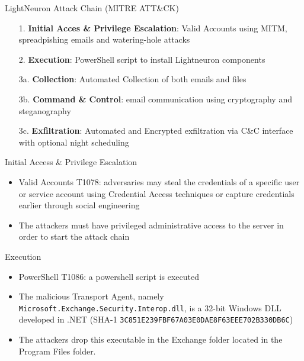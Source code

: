 \begin{frame}[fragile]{LightNeuron Attack Chain (MITRE ATT\&CK)}
    
    \begin{enumerate}
        \item[1.] \textbf{Initial Acces \& Privilege Escalation}: Valid Accounts using MITM, spreadpishing emails and watering-hole attacks
        \item[2.] \textbf{Execution}: PowerShell script to install Lightneuron components
        \item[3a.] \textbf{Collection}: Automated Collection of both emails and files
        \item[3b.] \textbf{Command \& Control}: email communication using cryptography and steganography
        \item[3c.] \textbf{Exfiltration}: Automated and Encrypted exfiltration via C\&C interface with optional night scheduling
    \end{enumerate}
\end{frame}

\begin{frame}[fragile]{Initial Access \& Privilege Escalation}
    \begin{itemize}
        \item Valid Accounts T1078: adversaries may steal the credentials of a 
        specific user or service account using Credential Access techniques
         or capture credentials earlier through social engineering \cite{MitreTechniques}
        \item The attackers must have privileged administrative access to 
        the server in order to start the attack chain 
    \end{itemize}
\end{frame}

\begin{frame}[fragile]{Execution}
    \begin{itemize}
        \item PowerShell T1086: a powershell script is executed
        \item The malicious Transport Agent, namely \texttt{Microsoft.Exchange.Security.Interop.dll}, is a 32-bit Windows DLL developed in .NET (SHA-1 \texttt{3C851E239FBF67A03E0DAE8F63EEE702B330DB6C})
        \item The attackers drop this executable in the Exchange folder located in the 
        Program Files folder.  
    \end{itemize}
\end{frame}

